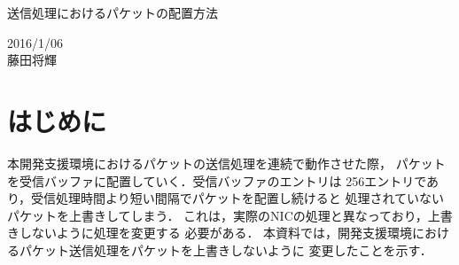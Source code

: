 \documentclass[12pt]{jsarticle}
\begin{document}

\begin{center}
    {\LARGE 送信処理におけるパケットの配置方法}
\end{center}

\begin{flushright}
    2016/1/06\\
    藤田将輝
\end{flushright}
\section{はじめに}
本開発支援環境におけるパケットの送信処理を連続で動作させた際，
パケットを受信バッファに配置していく．受信バッファのエントリは
256エントリであり，受信処理時間より短い間隔でパケットを配置し続けると
処理されていないパケットを上書きしてしまう．
これは，実際のNICの処理と異なっており，上書きしないように処理を変更する
必要がある．
本資料では，開発支援環境におけるパケット送信処理をパケットを上書きしないように
変更したことを示す．
\end{document}
